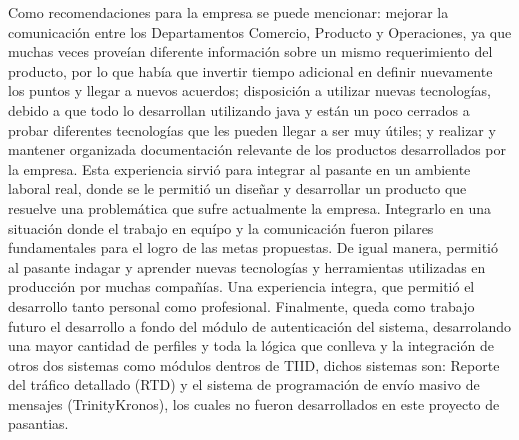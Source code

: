 \newline
\newline
\indent Como recomendaciones para la empresa se puede mencionar: mejorar la comunicación entre los Departamentos Comercio, Producto y Operaciones, ya que muchas veces proveían diferente información sobre un mismo requerimiento del producto, por lo que había que invertir tiempo adicional en definir nuevamente los puntos y llegar a nuevos acuerdos; disposición a utilizar nuevas tecnologías, debido a que todo lo desarrollan utilizando java y están un poco cerrados a probar diferentes tecnologías que les pueden llegar a ser muy útiles; y realizar y mantener organizada documentación relevante de los productos desarrollados por la empresa.
\newline
\newline
\indent Esta experiencia sirvió para integrar al pasante en un ambiente laboral real, donde se le permitió un diseñar y desarrollar un producto que resuelve una problemática que sufre actualmente la empresa. Integrarlo en una situación donde el trabajo en equípo y la comunicación fueron pilares fundamentales para el logro de las metas propuestas. De igual manera, permitió al pasante indagar y aprender nuevas tecnologías y herramientas utilizadas en producción por muchas compañías. Una experiencia integra, que permitió el desarrollo tanto personal como profesional.
\newline
\newline
\indent Finalmente, queda como trabajo futuro el desarrollo a fondo del módulo de autenticación del sistema, desarrolando una mayor cantidad de perfiles y toda la lógica que conlleva y la integración de otros dos sistemas como módulos dentros de TIID, dichos sistemas son: Reporte del tráfico detallado (RTD) y el sistema de programación de envío masivo de mensajes (TrinityKronos), los cuales no fueron desarrollados en este proyecto de pasantias.